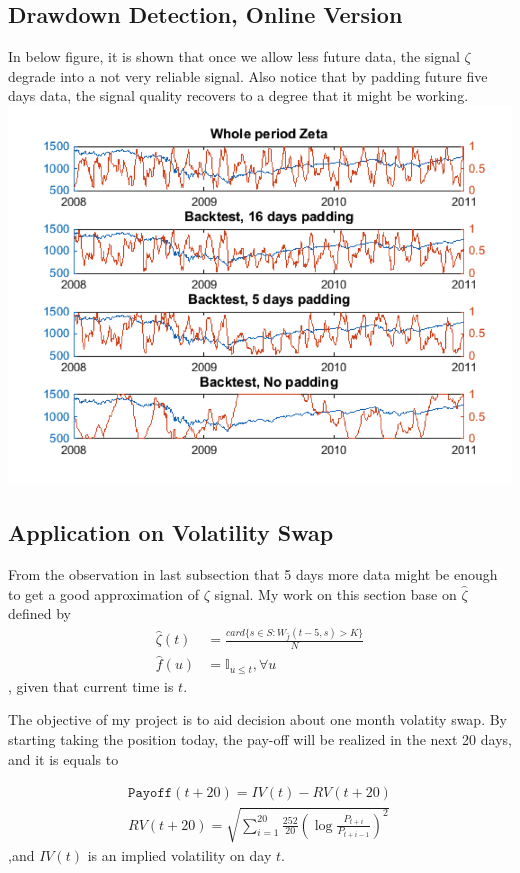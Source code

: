 \documentclass[a4paper]{article}
\begin{document}
\newpage
\subsection{Drawdown Detection, Online Version}
In below figure, it is shown that once we allow less future data, the signal $\zeta$ degrade into a not very reliable signal. Also notice that by padding future five days data, the signal quality recovers to a degree that it might be working.
\includegraphics[width=\textwidth]{boundaryeffect.png}

\newpage
\subsection{Application on Volatility Swap}

From the observation in last subsection that 5 days more data might be enough to get a good approximation of $\zeta$ signal. My work on this section base on $\hat{\zeta}$ defined by
\begin{align}
\hat{\zeta}(t) &= \frac{card{\{ s \in S: W_{\hat{f}}(t-5,s) > K\}}}{N} \\
\hat{f}(u) &= \mathbb{I}_{u \leq t}, \forall u \nonumber
\end{align}
, given that current time is $t$.

The objective of my project is to aid decision about one month volatity swap. By starting taking the position today, the pay-off will be realized in the next 20 days, and it is equals to

\begin{align}
\texttt{Payoff}(t+20) = IV(t) -  RV(t+20)\\
RV(t+20) = \sqrt{\sum_{i=1}^{20} \frac{252}{20}\left(\log{\frac{P_{t+i}}{P_{t+i-1}}}\right)^2 } \nonumber
\end{align}
,and $IV(t)$ is an implied volatility on day $t$.
\end{document}
